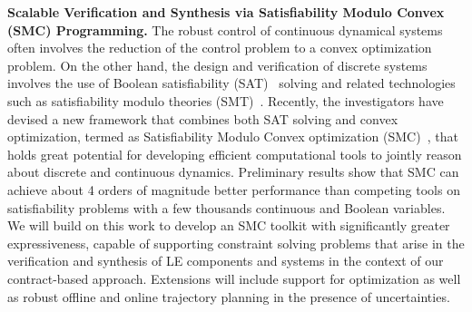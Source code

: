 \noindent\textbf{Scalable Verification and Synthesis via Satisfiability Modulo Convex (SMC) Programming.} 
The robust control of continuous dynamical systems often involves the reduction of the control problem to a convex optimization problem. On the other hand, the design and verification of discrete systems involves the use of Boolean satisfiability (SAT)~\cite{Malik09} solving and related technologies such as satisfiability modulo theories (SMT)~\cite{barrett-smtbookch09}. 
Recently, the investigators have devised a new framework that combines both SAT solving and convex optimization, termed as Satisfiability Modulo Convex optimization (SMC)~\cite{Shoukry2017}, that holds great potential for developing efficient computational tools to jointly reason about discrete and continuous dynamics. Preliminary results show that SMC can achieve about 4 orders of magnitude better performance than competing tools on satisfiability problems with a few thousands continuous and Boolean variables. 
We will build on this work to develop an SMC toolkit with significantly greater expressiveness, capable of supporting constraint solving problems that arise in the verification and synthesis of LE components and systems in the context of our contract-based approach. Extensions will include support for optimization as well as robust offline and online trajectory planning in the presence of uncertainties. 

